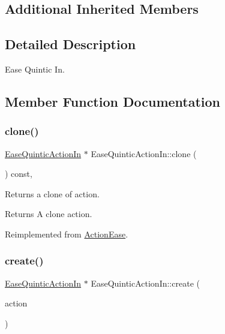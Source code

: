 \subsection*{Additional Inherited Members}


\subsection{Detailed Description}
Ease Quintic In. 

\subsection{Member Function Documentation}
\mbox{\label{classEaseQuinticActionIn_a181a8206b5d3bd9aedf4c8ba88087c6c}} 
\subsubsection{\texorpdfstring{clone()}{clone()}}
{\footnotesize\ttfamily \hyperlink{classEaseQuinticActionIn}{Ease\+Quintic\+Action\+In} $\ast$ Ease\+Quintic\+Action\+In\+::clone (\begin{DoxyParamCaption}\item[{void}]{ }\end{DoxyParamCaption}) const\hspace{0.3cm}{\ttfamily [override]}, {\ttfamily [virtual]}}

Returns a clone of action.

\begin{DoxyReturn}{Returns}
A clone action. 
\end{DoxyReturn}


Reimplemented from \hyperlink{classActionEase_a39bec93fe161fb732a74d8e51a2fe08b}{Action\+Ease}.

\mbox{\label{classEaseQuinticActionIn_a4dd41d1c68590ebbf128172b079b89ba}} 
\subsubsection{\texorpdfstring{create()}{create()}}
{\footnotesize\ttfamily \hyperlink{classEaseQuinticActionIn}{Ease\+Quintic\+Action\+In} $\ast$ Ease\+Quintic\+Action\+In\+::create (\begin{DoxyParamCaption}\item[{\hyperlink{classActionInterval}{Action\+Interval} $\ast$}]{action }\end{DoxyParamCaption})\hspace{0.3cm}{\ttfamily [static]}}



